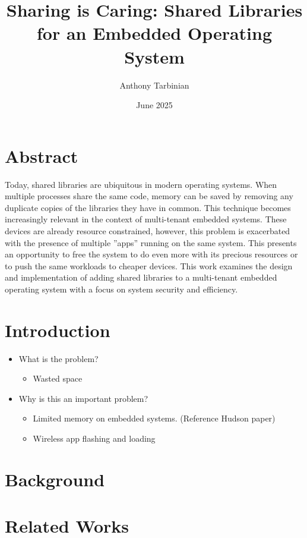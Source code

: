 \documentclass{article}
\title{Sharing is Caring: Shared Libraries for an Embedded Operating System}
\author{Anthony Tarbinian}
\date{June 2025}
\begin{document}
\maketitle

\section*{Abstract}

Today, shared libraries are ubiquitous in modern operating systems. %
When multiple processes share the same code, memory can be saved by removing any duplicate copies of the libraries they have in common. %
This technique becomes increasingly relevant in the context of multi-tenant embedded systems. %
These devices are already resource constrained, however, this problem is exacerbated with the presence of multiple ”apps” running on the same system. %
This presents an opportunity to free the system to do even more with its precious resources or to push the same workloads to cheaper devices. %
This work examines the design and implementation of adding shared libraries to a multi-tenant embedded operating system with a focus on system security and efficiency. %

\section*{Introduction}

\begin{itemize}
    \item What is the problem?
        \begin{itemize}
            \item Wasted space
        \end{itemize}
    \item Why is this an important problem?
        \begin{itemize}
            \item Limited memory on embedded systems. (Reference Hudson paper)
            \item Wireless app flashing and loading
        \end{itemize}
\end{itemize}

\section*{Background}

\section*{Related Works}
\end{document}
